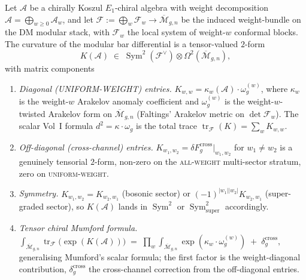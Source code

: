 \begin{theorem}
\label{thm:theoremD-tensor-arakelov}
Let $\mathcal{A}$ be a chirally Koszul $E_1$-chiral algebra with
weight decomposition $\mathcal{A} = \bigoplus_{w \ge 0}
\mathcal{A}_w$, and let
$\mathcal{F} := \bigoplus_w \mathcal{F}_w \to
\overline{\mathcal{M}}_{g,n}$ be the induced weight-bundle on the
DM modular stack, with $\mathcal{F}_w$ the local system of
weight-$w$ conformal blocks. The curvature of the modular bar
differential is a tensor-valued $2$-form
\[
 K(\mathcal{A}) \;\in\;
 \operatorname{Sym}^2(\mathcal{F}^\vee)
 \otimes \Omega^2(\overline{\mathcal{M}}_{g,n}),
\]
with matrix components
\begin{enumerate}
\item\label{td-i} \emph{Diagonal (UNIFORM-WEIGHT) entries.}
 $K_{w,w} = \kappa_w(\mathcal{A}) \cdot \omega_g^{(w)}$, where
 $\kappa_w$ is the weight-$w$ Arakelov anomaly coefficient and
 $\omega_g^{(w)}$ is the weight-$w$-twisted Arakelov form on
 $\overline{\mathcal{M}}_{g,n}$ (Faltings' Arakelov metric on
 $\det \mathcal{F}_w$). The scalar Vol~I formula
 $d^2 = \kappa \cdot \omega_g$ is the total trace
 $\operatorname{tr}_\mathcal{F}(K) = \sum_w K_{w,w}$.
\item\label{td-ii} \emph{Off-diagonal (cross-channel) entries.}
 $K_{w_1, w_2} = \delta F_g^{\mathrm{cross}}|_{w_1, w_2}$ for
 $w_1 \ne w_2$ is a genuinely tensorial $2$-form, non-zero on the
 \textsc{all-weight} multi-sector stratum, zero on
 \textsc{uniform-weight}.
\item\label{td-iii} \emph{Symmetry.}
 $K_{w_1, w_2} = K_{w_2, w_1}$ (bosonic sector) or
 $(-1)^{|w_1||w_2|} K_{w_2, w_1}$ (super-graded sector), so
 $K(\mathcal{A})$ lands in $\operatorname{Sym}^2$ or
 $\operatorname{Sym}^2_{\mathrm{super}}$ accordingly.
\item\label{td-iv} \emph{Tensor chiral Mumford formula.}
$
 \int_{\overline{\mathcal{M}}_{g,n}} \operatorname{tr}_\mathcal{F}
 \bigl(\exp(K(\mathcal{A}))\bigr)
 \;=\;
 \prod_w
 \int_{\overline{\mathcal{M}}_{g,n}} \exp(\kappa_w \cdot
 \omega_g^{(w)})
 \;+\; \delta^{\mathrm{cross}}_g,
$
\noindent
generalising Mumford's scalar formula; the first factor is the
weight-diagonal contribution, $\delta^{\mathrm{cross}}_g$ the
cross-channel correction from the off-diagonal entries.
\end{enumerate}
\end{theorem}

